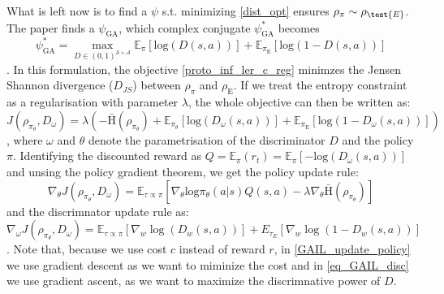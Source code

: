 What is left now is to find a $\psi$ s.t. minimizing \ref{dist_opt} ensures $\rho_{\pi} \sim \rho_{\test{E}}$. The paper finds a $\psi_{\text{GA}}$, which complex conjugate $\psi^*_{\text{GA}}$ becomes 
\begin{equation}
    \psi^*_{\text{GA}} = \max_{D\in(0,1)^{\mathcal{S} \times \mathcal{A}}} \mathbb{E}_{\pi}\left[ \text{log}(D(s,a))\right] + \mathbb{E}_{\pi_{\text{E}}}\left[ \text{log}(1 - D(s,a))\right]
\end{equation}
. In this formulation, the objective \ref{proto_inf_ler_c_reg} minimzes the Jensen Shannon divergence ($D_{JS}$) between $\rho_\pi$ and $\rho_{\text{E}}$. If we treat the entropy constraint as a regularisation with 
parameter $\lambda$, the whole objective can then be written as:
\begin{equation}
    J(\rho_{\pi_{\theta}}, D_{\omega}) = \lambda \left(- \bar{\text{H}}(\rho_{\pi_{\theta}} ) + \mathbb{E}_{\pi_{\theta}}\left[ \text{log}(D_{\omega}(s,a))\right] + \mathbb{E}_{\pi_{\text{E}}}\left[ \text{log}(1 - D_{\omega}(s,a))\right] \right)
\end{equation}
, where $\omega$ and $\theta$ denote the parametrisation of the discriminator $D$ and the policy $\pi$. Identifying the discounted reward as $Q = \mathbb{E}_{\pi}(r_t) = \mathbb{E}_{\pi}\left[-\text{log}(D_{\omega}(s,a))\right]$ and unsing the policy 
gradient theorem, we get the policy update rule:
\begin{equation}
    \label{GAIL_update_policy}
    \nabla_{\theta} J(\rho_{\pi_{\theta}}, D_{\omega}) = \mathbb{E}_{\tau \propto \pi}\left[ \nabla_{\theta}\text{log}\pi_{\theta}(a|s) Q(s,a) -\lambda \nabla_{\theta}\bar{\text{H}}(\rho_{\pi_{\theta}} )  \right]
\end{equation}
and the discrimnator update rule as:
\begin{equation}
    \label{eq_GAIL_disc}
    \nabla_{\omega} J(\rho_{\pi_{\theta}}, D_{\omega}) = \mathbb{E}_{\tau \propto \pi} [\nabla_w \log(D_w(s,a))] + {E}_{\tau_E} [\nabla_w \log(1 - D_w(s,a))]
\end{equation}
. Note that, because we use cost $c$ instead of reward $r$, in \ref{GAIL_update_policy} we use gradient descent as we want to miminize the cost and in \ref{eq_GAIL_disc} we 
use gradient ascent, as we want to maximize the discrimnative power of $D$. \\ \\

